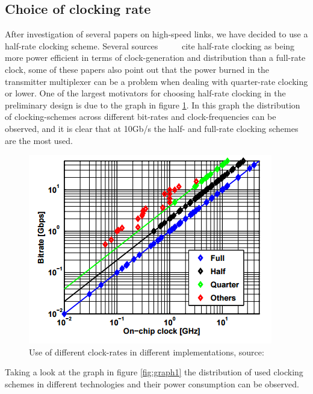 \subsection{Choice of clocking rate}
After investigation of several papers on high-speed links, we have decided to use a half-rate clocking scheme. Several sources ~\cite{rajesh2011a} ~\cite{palermo2010a} ~\cite{cressler2007a} cite half-rate clocking as being more power efficient in terms of clock-generation and distribution than a full-rate clock, some of these papers also point out that the power burned in the transmitter multiplexer can be a problem when dealing with quarter-rate clocking or lower. One of the largest motivators for choosing half-rate clocking in the preliminary design is due to the graph in figure \ref{fig:graph}. In this graph the distribution of clocking-schemes across different bit-rates and clock-frequencies can be observed, and it is clear that at 10Gb/s the half- and full-rate clocking schemes are the most used.

\begin{figure}[ht!]
\begin{center}
\includegraphics[scale=1.2]{img/clock0}
\caption{Use of different clock-rates in different implementations, source: ~\cite{rajesh2011a}}
\label{fig:graph}
\end{center}
\end{figure}

Taking a look at the graph in figure \ref{fig:graph1} the distribution of used clocking schemes in different technologies and their power consumption can be observed.

